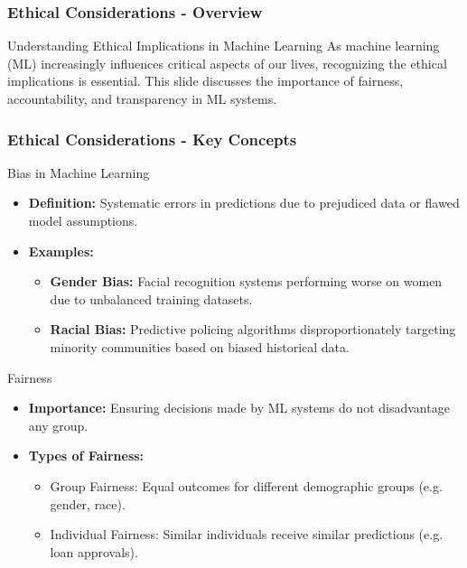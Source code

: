 \documentclass[aspectratio=169]{beamer}
\begin{document}
\begin{frame}[fragile]
    \frametitle{Ethical Considerations - Overview}
    \begin{block}{Understanding Ethical Implications in Machine Learning}
        As machine learning (ML) increasingly influences critical aspects of our lives, recognizing the ethical implications is essential. This slide discusses the importance of fairness, accountability, and transparency in ML systems.
    \end{block}
\end{frame}

\begin{frame}[fragile]
    \frametitle{Ethical Considerations - Key Concepts}
    \begin{block}{Bias in Machine Learning}
        \begin{itemize}
            \item \textbf{Definition:} Systematic errors in predictions due to prejudiced data or flawed model assumptions.
            \item \textbf{Examples:}
                \begin{itemize}
                    \item \textbf{Gender Bias:} Facial recognition systems performing worse on women due to unbalanced training datasets.
                    \item \textbf{Racial Bias:} Predictive policing algorithms disproportionately targeting minority communities based on biased historical data.
                \end{itemize}
        \end{itemize}
    \end{block}
    
    \begin{block}{Fairness}
        \begin{itemize}
            \item \textbf{Importance:} Ensuring decisions made by ML systems do not disadvantage any group.
            \item \textbf{Types of Fairness:}
                \begin{itemize}
                    \item Group Fairness: Equal outcomes for different demographic groups (e.g. gender, race).
                    \item Individual Fairness: Similar individuals receive similar predictions (e.g. loan approvals).
                \end{itemize}
        \end{itemize}
    \end{block}
\end{frame}
\end{document}
